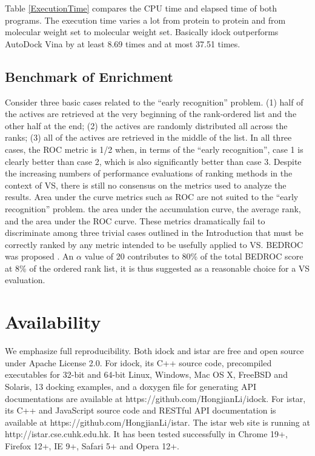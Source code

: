 \documentclass[10pt]{article}
\begin{document}
Table \ref{ExecutionTime} compares the CPU time and elapsed time of both programs. The execution time varies a lot from protein to protein and from molecular weight set to molecular weight set. Basically idock outperforms AutoDock Vina by at least 8.69 times and at most 37.51 times.

\subsection*{Benchmark of Enrichment}
Consider three basic cases related to the “early recognition” problem. (1) half of the actives are retrieved at the very beginning of the rank-ordered list and the other half at the end; (2) the actives are randomly distributed all across the ranks; (3) all of the actives are retrieved in the middle of the list. In all three cases, the ROC metric is 1/2 when, in terms of the “early recognition”, case 1 is clearly better than case 2, which is also significantly better than case 3.
Despite the increasing numbers of performance evaluations of ranking methods in the context of VS, there is still no consensus on the metrics used to analyze the results. Area under the curve metrics such as ROC are not suited to the “early recognition” problem. the area under the accumulation curve, the average rank, and the area under the ROC curve. These metrics dramatically fail to discriminate among three trivial cases outlined in the Introduction that must be correctly ranked by any metric intended to be usefully applied to VS.
BEDROC was proposed \cite{490}. An $\alpha$ value of 20 contributes to 80\% of the total BEDROC score at 8\% of the ordered rank list, it is thus suggested as a reasonable choice for a VS evaluation.

\section*{Availability}
We emphasize full reproducibility. Both idock and istar are free and open source under Apache License 2.0. For idock, its C++ source code, precompiled executables for 32-bit and 64-bit Linux, Windows, Mac OS X, FreeBSD and Solaris, 13 docking examples, and a doxygen file for generating API documentations are available at https://github.com/HongjianLi/idock. For istar, its C++ and JavaScript source code and RESTful API documentation is available at https://github.com/HongjianLi/istar. The istar web site is running at http://istar.cse.cuhk.edu.hk. It has been tested successfully in Chrome 19+, Firefox 12+, IE 9+, Safari 5+ and Opera 12+.
\end{document}
